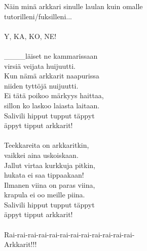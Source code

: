 
            Näin minä arkkari sinulle laulan kuin omalle \\
            tutorilleni/fuksilleni... \\
\hspace{10mm} \\
            Y, KA, KO, NE! \\
\hspace{10mm} \\
            ____läiset ne kammarissaan \\
            virsiä veijata huijuutti. \\
            Kun nämä arkkarit naapurissa \\
            niiden tyttöjä nuijuutti. \\
            Ei tätä poikoo märkyys haittaa, \\
            sillon ko laskoo laiasta laitaan. \\
            Salivili hipput tupput täppyt \\
            äppyt tipput arkkarit! \\
\hspace{10mm} \\
            Teekkareita on arkkaritkin, \\
            vaikkei aina uskoiskaan. \\
            Jallut virtaa kurkkuja pitkin, \\
            hukata ei saa tippaakaan! \\
            Ilmanen viina on paras viina, \\
            krapula ei oo meille piina. \\
            Salivili hipput tupput täppyt \\
            äppyt tipput arkkarit! \\
\hspace{10mm} \\
            Rai-rai-rai-rai-rai-rai-rai-rai-rai-rai-rai-rai- \\
            Arkkarit!!! \\
